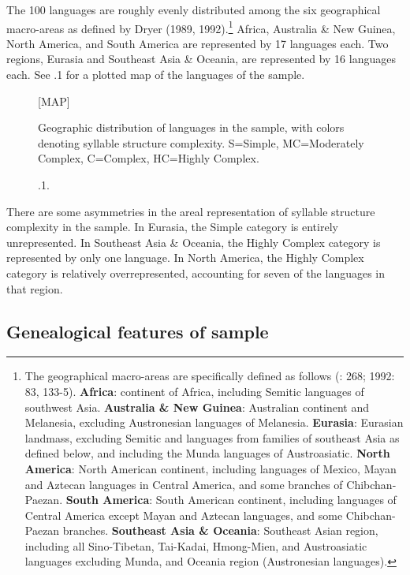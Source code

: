   The 100 languages are roughly evenly distributed among the six geographical macro-areas as defined by Dryer (1989, 1992).\footnote{{The geographical macro-areas are specifically defined as follows (\citealt{Dryer1989}: 268; 1992: 83, 133-5).} \textrm{\textbf{Africa}}\textrm{: continent of Africa, including Semitic languages of southwest Asia.} \textrm{\textbf{Australia \& New Guinea}}\textrm{: Australian continent and Melanesia, excluding Austronesian languages of Melanesia.} \textrm{\textbf{Eurasia}}\textrm{: Eurasian landmass, excluding Semitic and languages from families of southeast Asia as defined below, and including the Munda languages of Austroasiatic.} \textrm{\textbf{North America}}\textrm{: North American continent, including languages of Mexico, Mayan and Aztecan languages in Central America, and some branches of Chibchan-Paezan.} \textrm{\textbf{South America}}\textrm{: South American continent, including languages of Central America except Mayan and Aztecan languages, and some Chibchan-Paezan branches.} \textrm{\textbf{Southeast Asia \& Oceania}}\textrm{: Southeast Asian region, including all Sino-Tibetan, Tai-Kadai, Hmong-Mien, and Austroasiatic languages excluding Munda, and Oceania region (Austronesian languages).}} Africa, Australia \& New Guinea, North America, and South America are represented by 17 languages each. Two regions, Eurasia and Southeast Asia \& Oceania, are represented by 16 languages each. See .1 for a plotted map of the languages of the sample.

\begin{figure}
{}[MAP]
\caption{\label{fig:2}.1.} Geographic distribution of languages in the sample, with colors denoting syllable structure complexity. S=Simple, MC=Moderately Complex, C=Complex, HC=Highly Complex.
\end{figure}

  There are some asymmetries in the areal representation of syllable structure complexity in the sample. In Eurasia, the Simple category is entirely unrepresented. In Southeast Asia \& Oceania, the Highly Complex category is represented by only one language. In North America, the Highly Complex category is relatively overrepresented, accounting for seven of the languages in that region.

\subsection{Genealogical features of sample}\label{sec:2.4.2}


